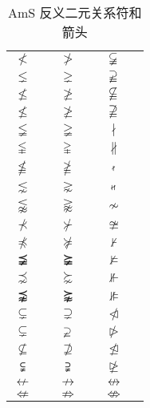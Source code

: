 \documentclass{article}
\makeatletter
\def\AMSSYM  #1{$#1$     & \texttt{\string#1}}
\newenvironment{symbols}[1]%
  {\small\def\arraystretch{1.5
  }
  \begin{tabular}{@{}#1@{}}}%
  {\end{tabular}}
\makeatother
\begin{document}
\begin{table}[htp]
\centering
\caption{{AmS} 反义二元关系符和箭头}\label{tbl:ams-negative}
\begin{symbols}{*3{cl}}
\hline
 \AMSSYM{\nless}           & \AMSSYM{\ngtr}            & \AMSSYM{\varsubsetneqq}    \\%
 \AMSSYM{\lneq}            & \AMSSYM{\gneq}            & \AMSSYM{\varsupsetneqq}    \\%
 \AMSSYM{\nleq}            & \AMSSYM{\ngeq}            & \AMSSYM{\nsubseteqq}       \\%
 \AMSSYM{\nleqslant}       & \AMSSYM{\ngeqslant}       & \AMSSYM{\nsupseteqq}       \\%
 \AMSSYM{\lneqq}           & \AMSSYM{\gneqq}           & \AMSSYM{\nmid}             \\
 \AMSSYM{\lvertneqq}       & \AMSSYM{\gvertneqq}       & \AMSSYM{\nparallel}        \\%
 \AMSSYM{\nleqq}           & \AMSSYM{\ngeqq}           & \AMSSYM{\nshortmid}        \\%
 \AMSSYM{\lnsim}           & \AMSSYM{\gnsim}           & \AMSSYM{\nshortparallel}   \\%
 \AMSSYM{\lnapprox}        & \AMSSYM{\gnapprox}        & \AMSSYM{\nsim}             \\
 \AMSSYM{\nprec}           & \AMSSYM{\nsucc}           & \AMSSYM{\ncong}            \\
 \AMSSYM{\npreceq}         & \AMSSYM{\nsucceq}         & \AMSSYM{\nvdash}           \\%
 \AMSSYM{\precneqq}        & \AMSSYM{\succneqq}        & \AMSSYM{\nvDash}           \\
 \AMSSYM{\precnsim}        & \AMSSYM{\succnsim}        & \AMSSYM{\nVdash}           \\
 \AMSSYM{\precnapprox}     & \AMSSYM{\succnapprox}     & \AMSSYM{\nVDash}           \\
 \AMSSYM{\subsetneq}       & \AMSSYM{\supsetneq}       & \AMSSYM{\ntriangleleft}    \\%
 \AMSSYM{\varsubsetneq}    & \AMSSYM{\varsupsetneq}    & \AMSSYM{\ntriangleright}   \\%
 \AMSSYM{\nsubseteq}       & \AMSSYM{\nsupseteq}       & \AMSSYM{\ntrianglelefteq}  \\
 \AMSSYM{\subsetneqq}      & \AMSSYM{\supsetneqq}      & \AMSSYM{\ntrianglerighteq} \\
 \AMSSYM{\nleftarrow}      & \AMSSYM{\nrightarrow}     & \AMSSYM{\nleftrightarrow}  \\
 \AMSSYM{\nLeftarrow}      & \AMSSYM{\nRightarrow}     & \AMSSYM{\nLeftrightarrow}  \\
\hline
\end{symbols}
\end{table}
\end{document}
